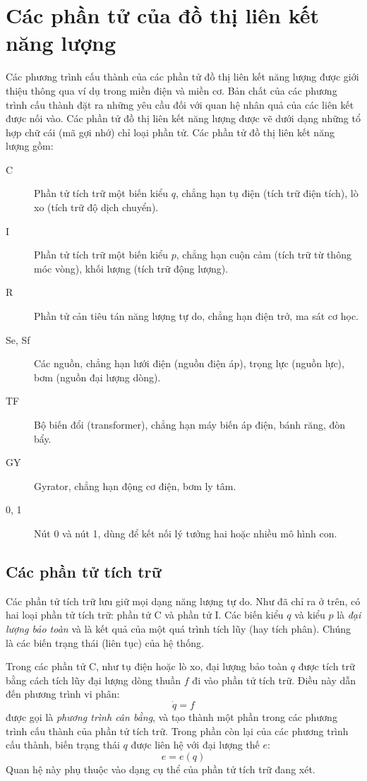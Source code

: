 \section{Các phần tử của đồ thị liên kết năng lượng}
Các phương trình cấu thành của các phần tử đồ thị liên kết năng lượng được giới thiệu thông qua ví dụ trong miền điện và miền cơ. Bản chất của các phương trình cấu thành đặt ra những yêu cầu đối với quan hệ nhân quả của các liên kết được nối vào. Các phần tử đồ thị liên kết năng lượng được vẽ dưới dạng những tổ hợp chữ cái (mã gợi nhớ) chỉ loại phần tử. Các phần tử đồ thị liên kết năng lượng gồm:
\begin{description}
\item[C] Phần tử tích trữ một biến kiểu $q$, chẳng hạn tụ điện (tích trữ điện tích), lò xo (tích trữ độ dịch chuyển).
\item[I] Phần tử tích trữ một biến kiểu $p$, chẳng hạn cuộn cảm (tích trữ từ thông móc vòng), khối lượng (tích trữ động lượng).
\item[R] Phần tử cản tiêu tán năng lượng tự do, chẳng hạn điện trở, ma sát cơ học.
\item[Se, Sf] Các nguồn, chẳng hạn lưới điện (nguồn điện áp), trọng lực (nguồn lực), bơm (nguồn đại lượng dòng).
\item[TF] Bộ biến đổi (transformer), chẳng hạn máy biến áp điện, bánh răng, đòn bẩy.
\item[GY] Gyrator, chẳng hạn động cơ điện, bơm ly tâm.
\item[0, 1] Nút 0 và nút 1, dùng để kết nối lý tưởng hai hoặc nhiều mô hình con.
\end{description}

\subsection{Các phần tử tích trữ}
Các phần tử tích trữ lưu giữ mọi dạng năng lượng tự do. Như đã chỉ ra ở trên, có hai loại phần tử tích trữ: phần tử C và phần tử I. Các biến kiểu $q$ và kiểu $p$ là \emph{đại lượng bảo toàn} và là kết quả của một quá trình tích lũy (hay tích phân). Chúng là các biến trạng thái (liên tục) của hệ thống.

Trong các phần tử C, như tụ điện hoặc lò xo, đại lượng bảo toàn $q$ được tích trữ bằng cách tích lũy đại lượng dòng thuần $f$ đi vào phần tử tích trữ. Điều này dẫn đến phương trình vi phân:
\[\dot q=f\]
được gọi là \emph{phương trình cân bằng}, và tạo thành một phần trong các phương trình cấu thành của phần tử tích trữ. Trong phần còn lại của các phương trình cấu thành, biến trạng thái $q$ được liên hệ với đại lượng thế $e$:
\[e=e(q)\]
Quan hệ này phụ thuộc vào dạng cụ thể của phần tử tích trữ đang xét.

